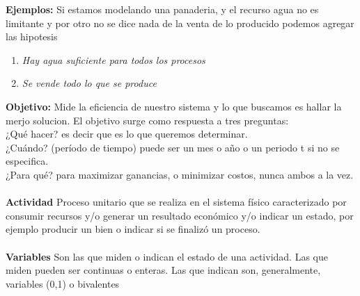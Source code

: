 \documentclass[12pt]{book}
\begin{document}
\textbf{Ejemplos:}
Si estamos modelando una panaderia, y el recurso agua no es limitante y por otro no se dice nada de 				la venta de lo producido podemos agregar las hipotesis
\begin{enumerate}
	\item 	
	\textit{Hay agua suficiente para todos los procesos}
	\item
	\textit{Se vende todo lo que se produce}
\end{enumerate}
\textbf{Objetivo: }Mide la eficiencia de nuestro sistema y lo que buscamos es hallar la merjo solucion. El objetivo surge como respuesta a tres preguntas:
\\¿Qué hacer? es decir que es lo que queremos determinar.
\\¿Cuándo? (período de tiempo) puede ser un mes o año o un periodo t si no se especifica.
\\¿Para qué? para maximizar ganancias, o minimizar costos, nunca ambos a la vez.
\\
\\
\textbf{Actividad}
Proceso unitario que se realiza en el sistema físico caracterizado por consumir recursos
y/o generar un resultado económico y/o indicar un estado, por ejemplo producir un bien o indicar si se finaliz\'o un proceso.
\\
\\
\textbf{Variables}
Son las que miden o indican el estado de una actividad.
Las que miden pueden ser continuas o enteras.
Las que indican son, generalmente, variables (0,1) o bivalentes
\end{document}

